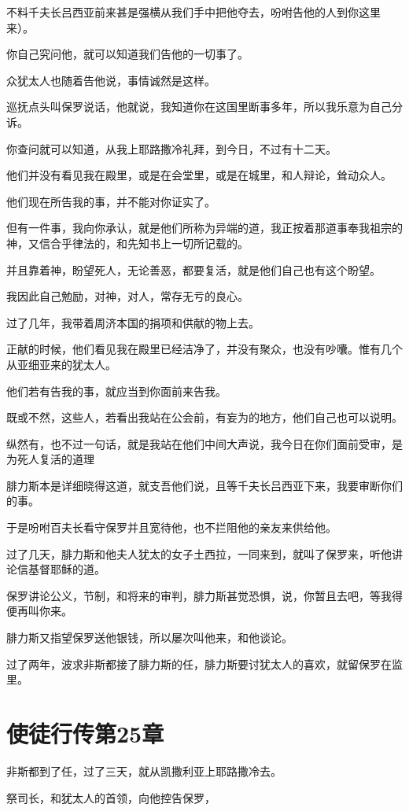 \documentclass[12pt,oneside]{book}
\begin{document}
不料千夫长吕西亚前来甚是强横从我们手中把他夺去，吩咐告他的人到你这里来）。

你自己究问他，就可以知道我们告他的一切事了。

众犹太人也随着告他说，事情诚然是这样。

巡抚点头叫保罗说话，他就说，我知道你在这国里断事多年，所以我乐意为自己分诉。

你查问就可以知道，从我上耶路撒冷礼拜，到今日，不过有十二天。

他们并没有看见我在殿里，或是在会堂里，或是在城里，和人辩论，耸动众人。

他们现在所告我的事，并不能对你证实了。

但有一件事，我向你承认，就是他们所称为异端的道，我正按着那道事奉我祖宗的神，又信合乎律法的，和先知书上一切所记载的。

并且靠着神，盼望死人，无论善恶，都要复活，就是他们自己也有这个盼望。

我因此自己勉励，对神，对人，常存无亏的良心。

过了几年，我带着周济本国的捐项和供献的物上去。

正献的时候，他们看见我在殿里已经洁净了，并没有聚众，也没有吵囔。惟有几个从亚细亚来的犹太人。

他们若有告我的事，就应当到你面前来告我。

既或不然，这些人，若看出我站在公会前，有妄为的地方，他们自己也可以说明。

纵然有，也不过一句话，就是我站在他们中间大声说，我今日在你们面前受审，是为死人复活的道理

腓力斯本是详细晓得这道，就支吾他们说，且等千夫长吕西亚下来，我要审断你们的事。

于是吩咐百夫长看守保罗并且宽待他，也不拦阻他的亲友来供给他。

过了几天，腓力斯和他夫人犹太的女子土西拉，一同来到，就叫了保罗来，听他讲论信基督耶稣的道。

保罗讲论公义，节制，和将来的审判，腓力斯甚觉恐惧，说，你暂且去吧，等我得便再叫你来。

腓力斯又指望保罗送他银钱，所以屡次叫他来，和他谈论。

过了两年，波求非斯都接了腓力斯的任，腓力斯要讨犹太人的喜欢，就留保罗在监里。

\chapter{使徒行传第25章}
非斯都到了任，过了三天，就从凯撒利亚上耶路撒冷去。

祭司长，和犹太人的首领，向他控告保罗，
\end{document}
